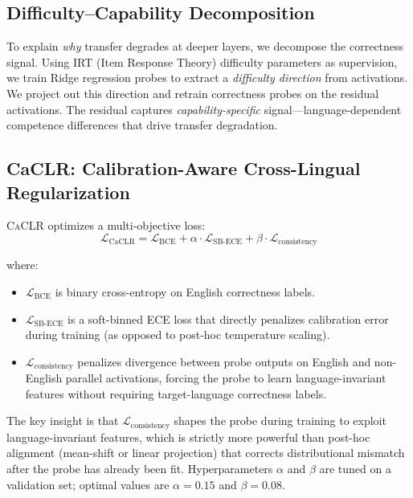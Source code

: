\documentclass[11pt,a4paper]{article}
\newcommand{\caclr}{\textsc{CaCLR}}
\begin{document}
\subsection{Difficulty--Capability Decomposition}
\label{sec:decomp}

To explain \emph{why} transfer degrades at deeper layers, we decompose the correctness signal. Using IRT (Item Response Theory) difficulty parameters as supervision, we train Ridge regression probes to extract a \emph{difficulty direction} from activations. We project out this direction and retrain correctness probes on the residual activations. The residual captures \emph{capability-specific} signal---language-dependent competence differences that drive transfer degradation.

\subsection{CaCLR: Calibration-Aware Cross-Lingual Regularization}
\label{sec:caclr}

\caclr{} optimizes a multi-objective loss:
\begin{equation}
\mathcal{L}_\text{CaCLR} = \mathcal{L}_\text{BCE} + \alpha \cdot \mathcal{L}_\text{SB-ECE} + \beta \cdot \mathcal{L}_\text{consistency}
\label{eq:caclr}
\end{equation}

\noindent where:
\begin{itemize}
\item $\mathcal{L}_\text{BCE}$ is binary cross-entropy on English correctness labels.
\item $\mathcal{L}_\text{SB-ECE}$ is a soft-binned ECE loss that directly penalizes calibration error during training (as opposed to post-hoc temperature scaling).
\item $\mathcal{L}_\text{consistency}$ penalizes divergence between probe outputs on English and non-English parallel activations, forcing the probe to learn language-invariant features without requiring target-language correctness labels.
\end{itemize}

The key insight is that $\mathcal{L}_\text{consistency}$ shapes the probe during training to exploit language-invariant features, which is strictly more powerful than post-hoc alignment (mean-shift or linear projection) that corrects distributional mismatch after the probe has already been fit. Hyperparameters $\alpha$ and $\beta$ are tuned on a validation set; optimal values are $\alpha=0.15$ and $\beta=0.08$.
\end{document}
